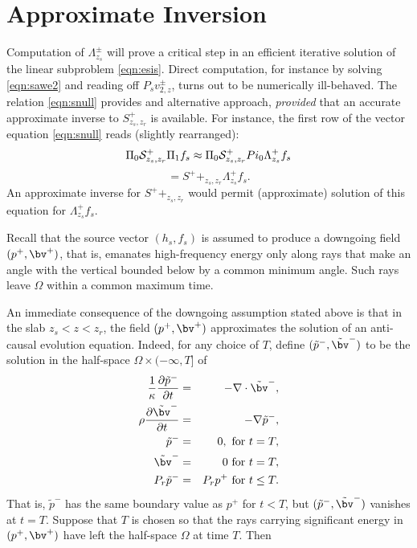 

\section{Approximate Inversion}

Computation of $\Lambda^{\pm}_{z_s}$ will prove a critical step in an
efficient iterative solution of the linear subproblem
\ref{eqn:esis}. Direct computation, for instance by solving
\ref{eqn:sawe2} and reading off $P_sv^{\pm}_{2,z}$, turns out to be
numerically ill-behaved. The relation \ref{eqn:snull} provides and
alternative approach, {\em provided} that an accurate approximate
inverse to $S^+_{z_s,z_r}$ is available. For instance, the first row
of the vector equation \ref{eqn:snull} reads (slightly rearranged):
\[
\Pi_0{\cal S}^+_{z_s,z_r}\Pi_1 f_s \approx \Pi_0{\cal
  S}^+_{z_s,z_r}Pi_0\Lambda^+_{z_s}f_s
\]
\begin{equation}
  \label{eqn:lamidea}
  = S^++_{z_s,z_r}\Lambda^+_{z_s}f_s.
\end{equation}
An approximate inverse for $S^++_{z_s,z_r}$ would permit (approximate)
solution of this equation for $\Lambda^+_{z_s}f_s$.

Recall that the source vector $(h_s,f_s)$ is assumed to produce a
downgoing field $(p^+,\bv^+)$, that is, emanates high-frequency energy only along
rays that make an angle with the vertical bounded below by a common
minimum angle. Such rays leave $\Omega$ within a common maximum time. 

An immediate consequence of the downgoing assumption stated above is that in the
slab $z_s<z<z_r$, the field $(p^+,\bv^+)$ approximates the solution of an
anti-causal evolution equation. Indeed, for any choice of $T$, define
$(\tilde{p}^-,\tilde{\bv}^-)$ to be the solution in the half-space
$\Omega \times (-\infty,T]$ of
\begin{eqnarray}
\label{eqn:revawe}
  \frac{1}{\kappa}\frac{\partial \tilde{p}^-}{\partial t} & = & - \nabla \cdot \tilde{\bv}^-, \nonumber \\
  \rho\frac{\partial \tilde{\bv}^-}{\partial t} & = & - \nabla \tilde{p}^-,\nonumber \\
  \tilde{p}^- & =& 0,  \mbox{ for } t=T,\nonumber\\ 
  \tilde{\bv}^- & = & 0 \mbox{ for } t=T,\nonumber\\
  P_r\tilde{p}^- &=& P_rp^+ \mbox { for } t \le T . 
\end{eqnarray}
That is, $\tilde{p}^-$ has the same boundary value as
$p^+$ for $t<T$, but $(\tilde{p}^-,\tilde{\bv}^-)$ vanishes at
$t=T$. Suppose that $T$ is chosen so that the rays carrying
significant energy in $(p^+,\bv^+)$ have left the half-space $\Omega$
at time $T$. Then

